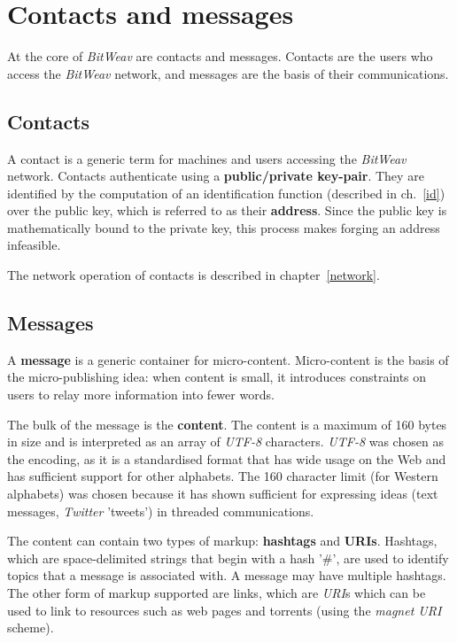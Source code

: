 \documentclass[10pt,a4paper,onecolumn]{article}
\begin{document}
\section{Contacts and messages}
\label{ContactsAndMessages}
At the core of \textit{BitWeav} are contacts and messages. Contacts are the users who access the \textit{BitWeav} network, and messages are the basis of their communications.

\subsection*{Contacts}
A contact is a generic term for machines and users accessing the \textit{BitWeav} network. Contacts authenticate using a \textbf{public/private key-pair}. They are identified by the computation of an identification function (described in ch.~\ref{id}) over the public key, which is referred to as their \textbf{address}. Since the public key is mathematically bound to the private key, this process makes forging an address infeasible.

The network operation of contacts is described in chapter~\ref{network}.

\subsection*{Messages}
A \textbf{message} is a generic container for micro-content. Micro-content is the basis of the micro-publishing idea: when content is small, it introduces constraints on users to relay more information into fewer words.

The bulk of the message is the \textbf{content}. The content is a maximum of 160 bytes in size and is interpreted as an array of \textit{UTF-8} characters. \textit{UTF-8} was chosen as the encoding, as it is a standardised format that has wide usage on the Web and has sufficient support for other alphabets. The 160 character limit (for Western alphabets) was chosen because it has shown sufficient for expressing ideas (text messages, \textit{Twitter} 'tweets') in threaded communications. 

The content can contain two types of markup: \textbf{hashtags} and \textbf{URIs}. Hashtags, which are space-delimited strings that begin with a hash '\#', are used to identify topics that a message is associated with. A message may have multiple hashtags. The other form of markup supported are links, which are \textit{URI}s which can be used to link to resources such as web pages and torrents (using the \textit{magnet URI} scheme).
\end{document}
